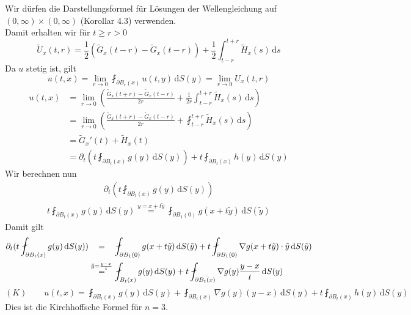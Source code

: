Wir dürfen die Darstellungsformel für Lösungen der Wellengleichung auf $(0,\infty) \times (0,\infty)$ (Korollar 4.3) verwenden. \\
Damit erhalten wir für $t \geq r > 0$
\[
	\tilde U_x(t,r) = \frac{1}{2} ( \tilde G_x(t-r)- \tilde G_x(t-r)) + \frac{1}{2} \int_{t-r}^{t+r} \tilde H_x(s) \,\mathrm{d}s
\]
Da $u$ stetig ist, gilt
\[
	u(t,x)= \lim_{r \to 0} \fint_{\partial B_r(x)}^{} u(t,y) \,\mathrm{d}S(y) = \lim_{r \to 0} U_x(t,r)
\]
\begin{align*}
	u(t,x) &= \lim_{r \to 0} \left( \frac{\tilde G_x(t+r)- \tilde G_x(t-r)}{2 r} + \frac{1}{2r} \int_{t-r}^{t+r} \tilde H_x(s) \,\mathrm{d}s \right) \\
	&= \lim_{r \to 0} \left( \frac{\tilde G_x(t+r) - \tilde G_x(t-r)}{2r} + \fint_{t-r}^{t+r} \tilde H_x(s) \,\mathrm{d}s \right) \\
	&= \tilde G_x'(t) + \tilde H_x(t) \\
	&= \partial_t ( t \fint_{\partial B_t(x)}^{} g(y) \,\mathrm{d}S(y)) + t \fint_{\partial B_t(x)}^{} h(y) \,\mathrm{d}S(y)
\end{align*}
Wir berechnen nun 
\begin{align*}
	\partial_t (t \fint_{\partial B_t(x)}^{} g(y) \,\mathrm{d}S(y))
\end{align*}
\begin{align*}
 t \fint_{\partial B_t(x)}^{} g(y) \,\mathrm{d}S(y)
	\stackrel{y= x+t \tilde y}{=} \fint_{\partial B_1(0)}^{} g(x + t \tilde y) \,\mathrm{d}S( \tilde y)
\end{align*}
Damit gilt
\begin{align*}
	\partial_t (t \fint_{\partial B_t(x)}^{} g(y) \,\mathrm{d}S(y)) & 
	\stackrel{\hphantom{\tilde y = \frac{y-x}{t}}}{=} \fint_{\partial B_1(0)}^{} g(x+t \tilde y) \,\mathrm{d}S( \tilde y) 
	+  t \fint_{\partial B_1(0)}^{}  \nabla g(x + t \tilde y) \cdot \tilde y \,\mathrm{d}S( \tilde y) \\
	& \stackrel{\tilde y = \frac{y-x}{t}}{=} \fint_{B_t(x)}^{} g(y) \,\mathrm{d}S(y) + t \fint_{\partial B_t(x)}^{}  \nabla g(y) \frac{y-x}{t} \,\mathrm{d}S(y)
\end{align*}
\[
	(K) \qquad u(t,x)= \fint_{\partial B_t(x)}^{} g(y) \,\mathrm{d}S(y) + \fint_{\partial B_t(x)}^{}  \nabla g(y) (y-x) \,\mathrm{d}S(y) + t \fint_{\partial B_t(x)}^{} h(y) \,\mathrm{d}S(y)
\]
Dies ist die Kirchhoffsche Formel für $n=3$.

